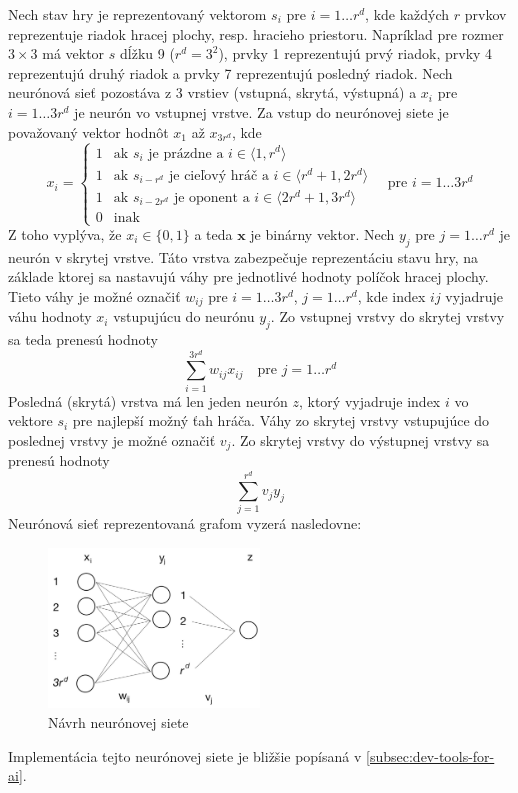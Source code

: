 Nech stav hry je reprezentovaný vektorom $s_i$ pre $i=1 \dots r^d$, kde každých $r$ prvkov reprezentuje riadok hracej
plochy, resp. hracieho priestoru.
Napríklad pre rozmer $3 \times 3$ má vektor $s$ dĺžku 9 ($r^d=3^2$), prvky 1  reprezentujú prvý riadok,
prvky 4  reprezentujú druhý riadok a prvky 7  reprezentujú posledný riadok.
Nech neurónová sieť pozostáva z 3 vrstiev (vstupná, skrytá, výstupná) a $x_i$ pre $i=1 \dots 3r^d$ je neurón vo vstupnej
vrstve.
Za vstup do neurónovej siete je považovaný vektor hodnôt $x_1$ až $x_{3r^d}$, kde
\begin{equation}
    x_i=
    \begin{cases}
        1 & \text{ak }s_i\text{ je prázdne a } i \in \langle 1, r^d \rangle \\
        1 & \text{ak }s_{i-r^d}\text{ je cieľový hráč a } i \in \langle r^d+1, 2r^d \rangle \\
        1 & \text{ak }s_{i-2r^d}\text{ je oponent a } i \in \langle 2r^d+1, 3r^d \rangle \\
        0 & \text{inak}
    \end{cases}
    \quad
    \text{pre }i=1 \dots 3r^d
\end{equation}
Z toho vyplýva, že $x_i \in \{0, 1\}$ a teda $\pmb{x}$ je binárny vektor.
Nech $y_j$ pre $j=1 \dots r^d$ je neurón v skrytej vrstve.
Táto vrstva zabezpečuje reprezentáciu stavu hry, na základe ktorej sa nastavujú váhy pre jednotlivé hodnoty políčok
hracej plochy.
Tieto váhy je možné označiť $w_{ij}$ pre $i=1 \dots 3r^d$, $j=1 \dots r^d$, kde index $ij$ vyjadruje váhu hodnoty
$x_i$ vstupujúcu do neurónu $y_j$.
Zo vstupnej vrstvy do skrytej vrstvy sa teda prenesú hodnoty
\begin{equation}
    \sum_{i=1}^{3r^d} w_{ij}x_{ij} \quad \text{pre } j=1 \dots r^d
\end{equation}
Posledná (skrytá) vrstva má len jeden neurón $z$, ktorý vyjadruje index $i$ vo vektore $s_i$ pre najlepší možný ťah
hráča.
Váhy zo skrytej vrstvy vstupujúce do poslednej vrstvy je možné označiť $v_j$.
Zo skrytej vrstvy do výstupnej vrstvy sa prenesú hodnoty
\begin{equation}
    \sum_{j=1}^{r^d} v_{j}y_{j}
\end{equation}
Neurónová sieť reprezentovaná grafom vyzerá nasledovne:

\begin{figure}[H]
    \centering
    \includegraphics[width=0.5\textwidth]{images/ann.jpg}
    \caption{Návrh neurónovej siete}
\end{figure}
Implementácia tejto neurónovej siete je bližšie popísaná v \autoref{subsec:dev-tools-for-ai}.

